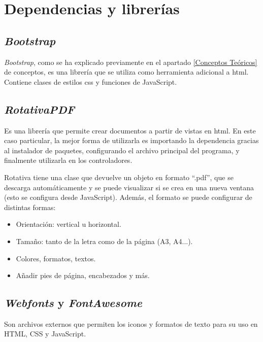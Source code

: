 \section{Dependencias y librerías}
\subsection{\emph{Bootstrap}}
\emph{Bootstrap}, como se ha explicado previamente en el apartado \ref{Conceptos Teóricos} de conceptos, es una librería que se utiliza como herramienta adicional a html. Contiene clases de estilos css y funciones de JavaScript.
\subsection{\emph{RotativaPDF}}
Es una librería que permite crear documentos a partir de vistas en html. En este caso particular, la mejor forma de utilizarla es importando la dependencia gracias al instalador de paquetes, configurando el archivo principal del programa, y finalmente utilizarla en los controladores.

Rotativa tiene una clase que devuelve un objeto en formato ``.pdf'', que se descarga automáticamente y se puede visualizar si se crea en una nueva ventana (esto se configura desde JavaScript). Además, el formato se puede configurar de distintas formas:
\begin{itemize}
\tightlist
 \item Orientación: vertical u horizontal.
 \item Tamaño: tanto de la letra como de la página (A3, A4...).
 \item Colores, formatos, textos. 
 \item Añadir pies de página, encabezados y más.
\end{itemize}
\subsection{\emph{Webfonts} y \emph{FontAwesome}}
Son archivos externos que permiten los iconos y formatos de texto para su uso en HTML, CSS y JavaScript.

